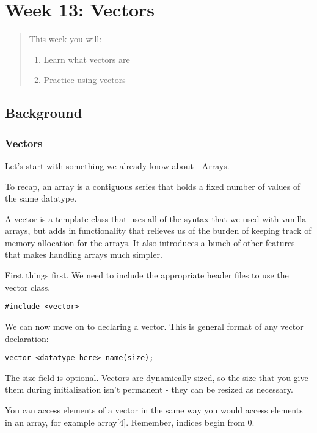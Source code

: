 \chapter*{Week 13: Vectors}
\setcounter{chapter}{14}
\setcounter{section}{0}

\begin{abstract}
This week you will:
\begin{enumerate}
    \item Learn what vectors are
    \item Practice using vectors 

\end{enumerate}
    
\end{abstract}

\section{Background}

\subsection{Vectors}

Let's start with something we already know about - Arrays.

To recap, an array is a contiguous series that holds a fixed number of values of the same datatype.

A vector is a template class that uses all of the syntax that we used with vanilla arrays, but adds in functionality that relieves us of the burden of keeping track of memory allocation for the arrays. It also introduces a bunch of other features that makes handling arrays much simpler.

First things first. We need to include the appropriate header files to use the vector class.

\texttt{#include <vector>}

We can now move on to declaring a vector. This is general format of any vector declaration:

\texttt{vector <datatype_here> name(size);}

The size field is optional. Vectors are dynamically-sized, so the size that you give them during initialization isn't permanent - they can be resized as necessary.

You can access elements of a vector in the same way you would access elements in an array, for example array[4]. Remember, indices begin from 0.

